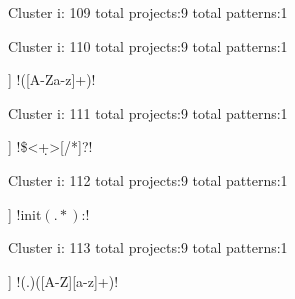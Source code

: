 Cluster i: 109
total projects:9
total patterns:1
\begin{multicols}{1}
\end{multicols}







Cluster i: 110
total projects:9
total patterns:1
\begin{multicols}{1}
\begin{description}[noitemsep,topsep=0pt]
\item [[9] ] \cverb!\/([A-Za-z]+)!
\end{description}
\end{multicols}







Cluster i: 111
total projects:9
total patterns:1
\begin{multicols}{1}
\begin{description}[noitemsep,topsep=0pt]
\item [[9] ] \cverb!\$<\d+>[/*]?!
\end{description}
\end{multicols}







Cluster i: 112
total projects:9
total patterns:1
\begin{multicols}{1}
\begin{description}[noitemsep,topsep=0pt]
\item [[9] ] \cverb!init\((.*)\):!
\end{description}
\end{multicols}







Cluster i: 113
total projects:9
total patterns:1
\begin{multicols}{1}
\begin{description}[noitemsep,topsep=0pt]
\item [[9] ] \cverb!(.)([A-Z][a-z]+)!
\end{description}
\end{multicols}







